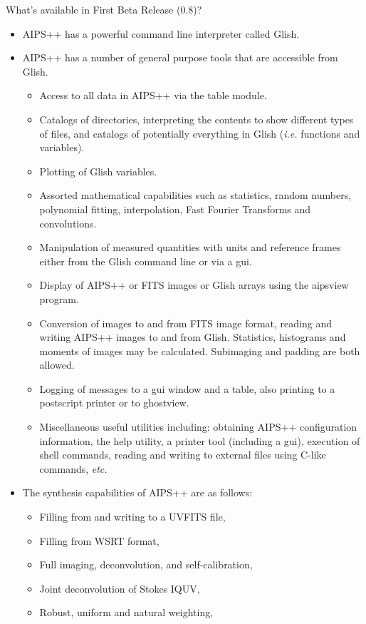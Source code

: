 \begin{slide}{What's available in First Beta Release (0.8)?}
\begin{itemize}
\item AIPS++ has a powerful command line interpreter called Glish.
\item AIPS++ has a number of general purpose tools that are accessible
from Glish.
\begin{itemize}
\item Access to all data in AIPS++ via the table module.
\item Catalogs of directories, interpreting the contents to show 
different types of files, and catalogs of potentially everything in Glish
({\em i.e.} functions and variables).
\item Plotting of Glish variables.
\item Assorted mathematical capabilities such as 
statistics, random numbers, polynomial fitting, interpolation,
Fast Fourier Transforms and convolutions.
\item Manipulation of measured quantities with units and reference
frames either from the Glish command line or via a gui.
\item Display of AIPS++ or FITS images or Glish arrays using the
aipsview program.
\item Conversion of images to and from FITS image format, 
reading and writing AIPS++ images to and from Glish. Statistics, histograms and 
moments of images may be calculated. Subimaging and padding are both allowed.
\item Logging of messages to a gui window and a table, also printing
to a postscript printer or to ghostview.
\item Miscellaneous useful utilities including: obtaining AIPS++ 
configuration information, the help utility, 
a printer tool (including a gui), execution of shell commands, reading and 
writing to external files using C-like commands, {\em etc.}
\end{itemize}
\item The synthesis capabilities of AIPS++ are as follows:
\begin{itemize}
\item Filling from and writing to a UVFITS file,
\item Filling from WSRT format,
\item Full imaging, deconvolution, and self-calibration,
\item Joint deconvolution of Stokes IQUV,
\item Robust, uniform and natural weighting,

\end{itemize}
\end{itemize}
\end{slide}
